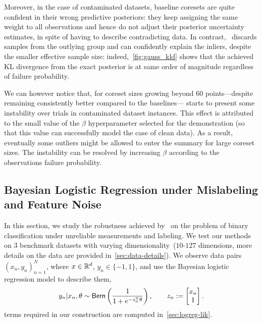 Moreover, in the case of contaminated datasets, baseline coresets are quite confident in their wrong predictive posteriors: they keep assigning the same weight to all observations and hence do not adjust their posterior uncertainty estimates, in spite of having to describe contradicting data. In contrast,~\bcores{} discards samples from the outlying group and can confidently explain the inliers, despite the smaller effective sample size: indeed,~\cref{fig:gauss_kld} shows that the achieved KL divergence from the exact posterior is at same order of magnitude regardless of failure probability. 

We can however notice that, for coreset sizes growing beyond 60 points---despite remaining consistently better compared to the baselines---\bcores{} starts to present some instability over trials in contaminated dataset instances. This effect is attributed to the small value of the $\beta$ hyperparameter  selected for the demonstration (so that this value can successfully model the case of clean data). As a result, eventually some outliers might be allowed to enter the summary for large coreset sizes. The instability can be resolved by increasing $\beta$ according to the observations failure probability. 


\subsection{Bayesian Logistic Regression under Mislabeling and Feature Noise}
\label{subsec:logreg-expt}


In this section, we study the robustness achieved by~\bcores{} on the problem of binary classification  under unreliable measurements and labeling. We test our methods on 3 benchmark datasets with varying dimensionality~($10$-$127$ dimensions, more details on the data are provided in~\cref{sec:data-details}). We observe data pairs $(x_n, y_n)_{n=1}^{N}$, where $x\in\mathbb{R}^{d}$, $y_n \in \{-1,1\}$, and use the Bayesian logistic regression model to describe them,
\[
y_n | x_n, \theta \sim {\sf{Bern}} \left( \frac{1}{1+e^{-z_n^T \theta}}\right),
\qquad 
z_n:=\begin{bmatrix}
x_n \\
1
\end{bmatrix}.
\label{eq:logreg-model}
\]
\blik{} terms required in our construction are computed in~\cref{sec:logreg-lik}. 

